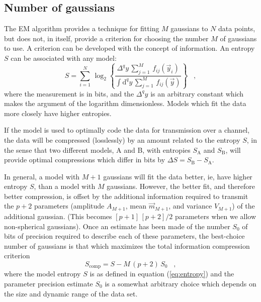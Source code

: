 \documentclass{article}
\begin{document}
\subsection{Number of gaussians}

The EM algorithm provides a technique for fitting $M$ gaussians to $N$
data points, but does not, in itself, provide a criterion for choosing
the number $M$ of gaussians to use.  A criterion can be developed with
the concept of information.  An entropy $S$ can be associated with any
model:
\begin{equation}
\label{eq:entropy}
S= \sum_{i=1}^N\,\log_2\left\{\frac{\Delta^qy\,\sum_{j=1}^M\,f_{ij}(\vec{y}_i)}
  {\int\mathrm{d}^qy\,\sum_{j=1}^M\,f_{ij}(\vec{y})}\right\} \;\;\; ,
\end{equation}
where the measurement is in bits, and the $\Delta^qy$ is an arbitrary
constant which makes the argument of the logarithm dimensionless.
Models which fit the data more closely have higher entropies.

If the model is used to optimally code the data for transmission over
a channel, the data will be compressed (losslessly) by an amount
related to the entropy $S$, in the sense that two different models, A
and B, with entropies $S_\mathrm{A}$ and $S_\mathrm{B}$, will provide
optimal compressions which differ in bits by $\Delta
S=S_\mathrm{B}-S_\mathrm{A}$.

In general, a model with $M+1$ gaussians will fit the data better, ie,
have higher entropy $S$, than a model with $M$ gaussians.  However,
the better fit, and therefore better compression, is offset by the
additional information required to transmit the $p+2$ parameters
(amplitude $A_{M+1}$, mean $\vec{m}_{M+1}$, and variance $V_{M+1}$) of
the additional gaussian.  (This becomes $[p+1]\,[p+2]/2$ parameters
when we allow non-spherical gaussians).  Once an estimate has been
made of the number $S_0$ of bits of precision required to describe
each of these parameters, the best-choice number of gaussians is that
which maximizes the total information compression criterion
\begin{equation}
S_\mathrm{comp}= S-M\,(p+2)\,S_0 \;\;\; ,
\end{equation}
where the model entropy $S$ is as defined in equation
(\ref{eq:entropy}) and the parameter precision estimate $S_0$ is a
somewhat arbitrary choice which depends on the size and dynamic range
of the data set.
\end{document}

